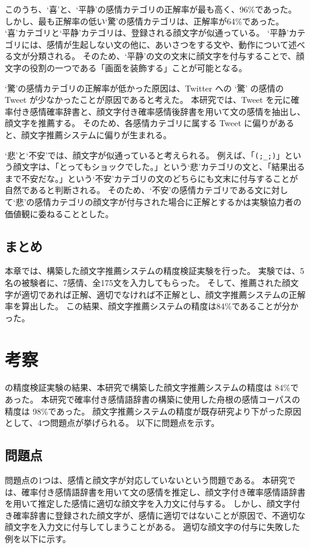 \documentclass[11pt,a4j]{jsarticle}
\begin{document}
このうち、`喜'と、`平静'の感情カテゴリの正解率が最も高く、96\%であった。
しかし、最も正解率の低い`驚'の感情カテゴリは、正解率が64\%であった。
`喜'カテゴリと`平静'カテゴリは、登録される顔文字が似通っている。
`平静'カテゴリには、感情が生起しない文の他に、あいさつをする文や、動作について述べる文が分類される。
そのため、`平静'の文の文末に顔文字を付与することで、顔文字の役割の一つである「画面を装飾する」ことが可能となる。

`驚'の感情カテゴリの正解率が低かった原因は、Twitter への `驚' の感情の Tweet が少なかったことが原因であると考えた。
本研究では、Tweet を元に確率付き感情確率辞書と、顔文字付き確率感情後辞書を用いて文の感情を抽出し、顔文字を推薦する。
そのため、各感情カテゴリに属する Tweet に偏りがあると、顔文字推薦システムに偏りが生まれる。

`悲'と`不安'では、顔文字が似通っていると考えられる。
例えば、「\verb|(;_;)|」という顔文字は、「とってもショックでした。」という`悲'カテゴリの文と、「結果出るまで不安だな。」という`不安'カテゴリの文のどちらにも文末に付与することが自然であると判断される。
そのため、`不安'の感情カテゴリである文に対して`悲'の感情カテゴリの顔文字が付与された場合に正解とするかは実験協力者の価値観に委ねることとした。

\subsection{まとめ}
本章では、構築した顔文字推薦システムの精度検証実験を行った。
実験では、5名の被験者に、7感情、全175文を入力してもらった。
そして、推薦された顔文字が適切であれば正解、適切でなければ不正解とし、顔文字推薦システムの正解率を算出した。
この結果、顔文字推薦システムの精度は84\%であることが分かった。

\section{考察}\label{sec:analyze}
の精度検証実験の結果、本研究で構築した顔文字推薦システムの精度は 84\%であった。
本研究で確率付き感情語辞書の構築に使用した舟根の感情コーパスの精度は 98\%であった。
顔文字推薦システムの精度が既存研究より下がった原因として、4つ問題点が挙げられる。
以下に問題点を示す。

\subsection{問題点}
問題点の1つは、感情と顔文字が対応していないという問題である。
本研究では、確率付き感情語辞書を用いて文の感情を推定し、顔文字付き確率感情語辞書を用いて推定した感情に適切な顔文字を入力文に付与する。
しかし、顔文字付き確率辞書に登録された顔文字が、感情に適切ではないことが原因で、不適切な顔文字を入力文に付与してしまうことがある。
適切な顔文字の付与に失敗した例を以下に示す。
\end{document}
